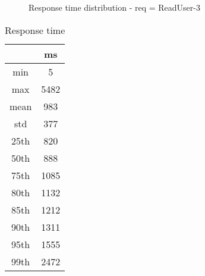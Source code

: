 \begin{minipage}{0.75\linewidth}
\begin{figure}[h]
\begin{adjustbox}{max width=1.0\linewidth, keepaspectratio}
  \end{adjustbox}
  \caption{Response time distribution - req = ReadUser-3}
\end{figure}
\end{minipage}\hfill\begin{minipage}{0.18\linewidth}
\begin{table}[h]
\begin{tabular}{|cc|}
\hline
\textbf{} & \textbf{ms}\\ \hline
 \Xhline{0.005\arrayrulewidth}
min & 5\\
 \Xhline{0.005\arrayrulewidth}
max & 5482\\
 \Xhline{0.005\arrayrulewidth}
mean & 983\\
 \Xhline{0.005\arrayrulewidth}
std & 377\\
\hline
\hline
 \Xhline{0.005\arrayrulewidth}
25th & 820\\
 \Xhline{0.005\arrayrulewidth}
50th & 888\\
 \Xhline{0.005\arrayrulewidth}
75th & 1085\\
 \Xhline{0.005\arrayrulewidth}
80th & 1132\\
 \Xhline{0.005\arrayrulewidth}
85th & 1212\\
 \Xhline{0.005\arrayrulewidth}
90th & 1311\\
 \Xhline{0.005\arrayrulewidth}
95th & 1555\\
 \Xhline{0.005\arrayrulewidth}
99th & 2472\\
\hline
\end{tabular}
\caption{Response time}
\end{table}
\end{minipage}\hfill